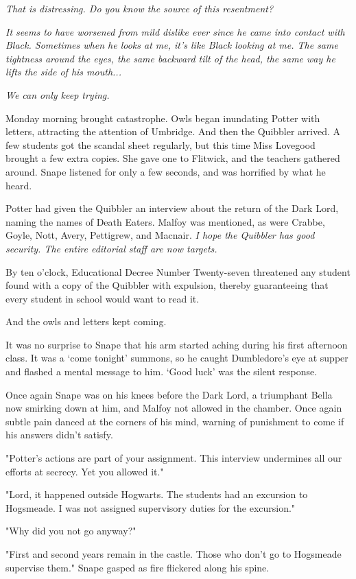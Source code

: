 \documentclass[a4paper,11pt]{article}
\begin{document}
\emph{That is distressing. Do you know the source of this resentment?}

\emph{It seems to have worsened from mild dislike ever since he came into contact with Black. Sometimes when he looks at me, it's like Black looking at me. The same tightness around the eyes, the same backward tilt of the head, the same way he lifts the side of his mouth...}

\emph{We can only keep trying.}

Monday morning brought catastrophe. Owls began inundating Potter with letters, attracting the attention of Umbridge. And then the Quibbler arrived. A few students got the scandal sheet regularly, but this time Miss Lovegood brought a few extra copies. She gave one to Flitwick, and the teachers gathered around. Snape listened for only a few seconds, and was horrified by what he heard.

Potter had given the Quibbler an interview about the return of the Dark Lord, naming the names of Death Eaters. Malfoy was mentioned, as were Crabbe, Goyle, Nott, Avery, Pettigrew, and Macnair. \emph{I hope the Quibbler has good security. The entire editorial staff are now targets.}

By ten o'clock, Educational Decree Number Twenty-seven threatened any student found with a copy of the Quibbler with expulsion, thereby guaranteeing that every student in school would want to read it.

And the owls and letters kept coming.

It was no surprise to Snape that his arm started aching during his first afternoon class. It was a `come tonight' summons, so he caught Dumbledore's eye at supper and flashed a mental message to him. `Good luck' was the silent response.

Once again Snape was on his knees before the Dark Lord, a triumphant Bella now smirking down at him, and Malfoy not allowed in the chamber. Once again subtle pain danced at the corners of his mind, warning of punishment to come if his answers didn't satisfy.

"Potter's actions are part of your assignment. This interview undermines all our efforts at secrecy. Yet you allowed it."

"Lord, it happened outside Hogwarts. The students had an excursion to Hogsmeade. I was not assigned supervisory duties for the excursion."

"Why did you not go anyway?"

"First and second years remain in the castle. Those who don't go to Hogsmeade supervise them." Snape gasped as fire flickered along his spine.
\end{document}
